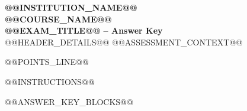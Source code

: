 \documentclass[11pt,a4paper]{article}
\begin{document}
\begin{center}
{\Large \textbf{@@INSTITUTION_NAME@@}}\\
{\large \textbf{@@COURSE_NAME@@}}\\
{\large \textbf{@@EXAM_TITLE@@ -- Answer Key}}\\
@@HEADER_DETAILS@@
@@ASSESSMENT_CONTEXT@@
\end{center}

@@POINTS_LINE@@

@@INSTRUCTIONS@@

@@ANSWER_KEY_BLOCKS@@
\end{document}
